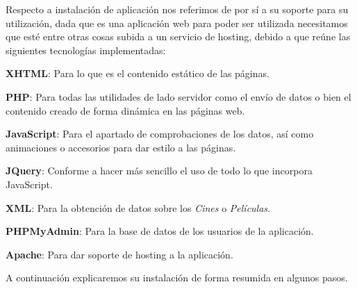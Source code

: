 \begin{DoxyCode}{0}
\end{DoxyCode}




Respecto a instalación de aplicación nos referimos de por sí a su soporte para su utilización, dada que es una aplicación web para poder ser utilizada necesitamos que esté entre otras cosas subida a un servicio de hosting, debido a que reúne las siguientes tecnologías implementadas\+:


\begin{DoxyItemize}
\item {\bfseries{X\+H\+T\+ML}}\+: Para lo que es el contenido estático de las páginas.
\item {\bfseries{P\+HP}}\+: Para todas las utilidades de lado servidor como el envío de datos o bien el contenido creado de forma dinámica en las páginas web.
\item {\bfseries{Java\+Script}}\+: Para el apartado de comprobaciones de los datos, así como animaciones o accesorios para dar estilo a las páginas.
\item {\bfseries{J\+Query}}\+: Conforme a hacer más sencillo el uso de todo lo que incorpora Java\+Script.
\item {\bfseries{X\+ML}}\+: Para la obtención de datos sobre los {\itshape Cines} o {\itshape Películas}.
\item {\bfseries{P\+H\+P\+My\+Admin}}\+: Para la base de datos de los usuarios de la aplicación.
\item {\bfseries{Apache}}\+: Para dar soporte de hosting a la aplicación.
\end{DoxyItemize}

A continuación explicaremos su instalación de forma resumida en algunos pasos.


